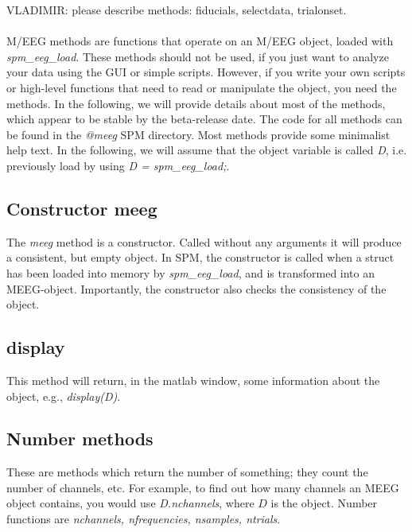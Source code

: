 VLADIMIR: please describe methods: fiducials, selectdata, trialonset.
\\
\\
M/EEG methods are functions that operate on an M/EEG object, loaded
with \textit{spm\_eeg\_load}. These methods should not be used, if you just
want to analyze your data using the GUI or simple scripts. However, if
you write your own scripts or high-level functions that need to read
or manipulate the object, you need the methods. In the following, we
will provide details about most of the methods, which appear to be
stable by the beta-release date. The code for all methods
can be found in the \textit{@meeg} SPM directory. Most methods provide
some minimalist help text. In the following, we will assume that the
object variable is called \textit{D}, i.e. previously load by using \textit{D
  = spm\_eeg\_load;}.

\subsection{Constructor meeg}
The \textit{meeg} method is a constructor. Called without any arguments it
will produce a consistent, but empty object. In SPM, the constructor
is called when a struct has been loaded into memory by
\textit{spm\_eeg\_load}, and is transformed into an
MEEG-object. Importantly, the constructor also checks the consistency
of the object. 

\subsection{display}
This method will return, in the matlab window, some information about
the object, e.g., \textit{display(D)}. 

\subsection{Number methods}
These are methods which return the number of something; they count the
number of channels, etc. For example, to find out how many channels an
MEEG object contains, you would use \textit{D.nchannels}, where $D$ is the
object. Number functions are \textit{nchannels, nfrequencies, nsamples,
  ntrials}.



